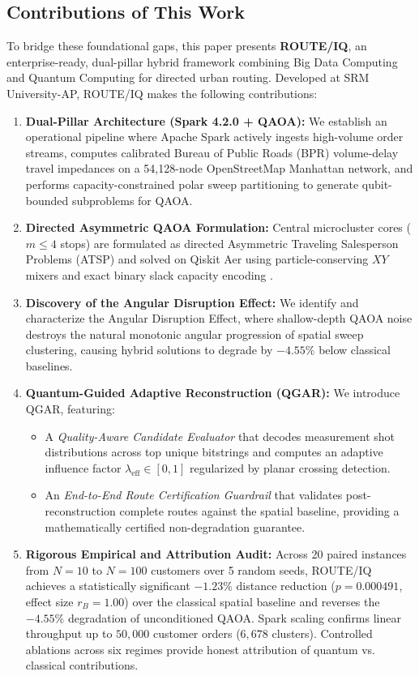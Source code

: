 \documentclass[journal,10pt]{IEEEtran}
\begin{document}
\subsection{Contributions of This Work}
To bridge these foundational gaps, this paper presents \textbf{ROUTE/IQ}, an enterprise-ready, dual-pillar hybrid framework combining Big Data Computing and Quantum Computing for directed urban routing. Developed at SRM University-AP, ROUTE/IQ makes the following contributions:
\begin{enumerate}
    \item \textbf{Dual-Pillar Architecture (Spark 4.2.0 + QAOA):} We establish an operational pipeline where Apache Spark actively ingests high-volume order streams, computes calibrated Bureau of Public Roads (BPR) volume-delay travel impedances on a 54,128-node OpenStreetMap Manhattan network, and performs capacity-constrained polar sweep partitioning to generate qubit-bounded subproblems for QAOA.
    \item \textbf{Directed Asymmetric QAOA Formulation:} Central microcluster cores ($m \le 4$ stops) are formulated as directed Asymmetric Traveling Salesperson Problems (ATSP) and solved on Qiskit Aer using particle-conserving $XY$ mixers \cite{hadfield2019qaoa, wang2020xy} and exact binary slack capacity encoding \cite{harwood2021formulating}.
    \item \textbf{Discovery of the Angular Disruption Effect:} We identify and characterize the Angular Disruption Effect, where shallow-depth QAOA noise destroys the natural monotonic angular progression of spatial sweep clustering, causing hybrid solutions to degrade by $-4.55\%$ below classical baselines.
    \item \textbf{Quantum-Guided Adaptive Reconstruction (QGAR):} We introduce QGAR, featuring:
    \begin{itemize}
        \item A \textit{Quality-Aware Candidate Evaluator} that decodes measurement shot distributions across top unique bitstrings and computes an adaptive influence factor $\lambda_{\text{eff}} \in [0, 1]$ regularized by planar crossing detection.
        \item An \textit{End-to-End Route Certification Guardrail} that validates post-reconstruction complete routes against the spatial baseline, providing a mathematically certified non-degradation guarantee.
    \end{itemize}
    \item \textbf{Rigorous Empirical and Attribution Audit:} Across 20 paired instances from $N=10$ to $N=100$ customers over 5 random seeds, ROUTE/IQ achieves a statistically significant $-1.23\%$ distance reduction ($p = 0.000491$, effect size $r_B = 1.00$) over the classical spatial baseline and reverses the $-4.55\%$ degradation of unconditioned QAOA. Spark scaling confirms linear throughput up to $50,000$ customer orders ($6,678$ clusters). Controlled ablations across six regimes provide honest attribution of quantum vs. classical contributions.
\end{enumerate}
\end{document}

